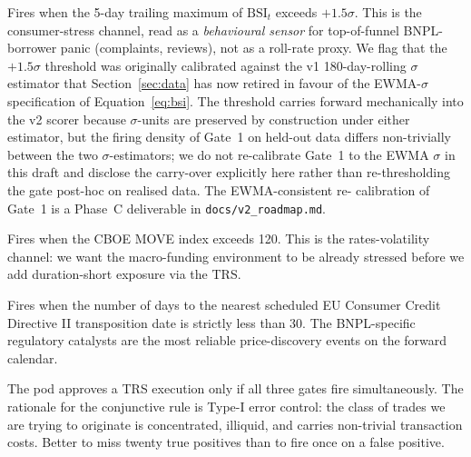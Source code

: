 \documentclass[11pt,letterpaper]{article}
\newcommand{\bsi}{\text{BSI}}
\begin{document}
\begin{description}[leftmargin=2em,style=nextline]
\item[Gate~1 --- BSI momentum.] Fires when the 5-day trailing
maximum of $\bsi_t$ exceeds $+1.5\sigma$. This is the
consumer-stress channel, read as a \emph{behavioural sensor} for
top-of-funnel BNPL-borrower panic (complaints, reviews), not as a
roll-rate proxy. We flag that the $+1.5\sigma$ threshold was
originally calibrated against the v1 180-day-rolling $\sigma$
estimator that Section~\ref{sec:data} has now retired in favour of
the EWMA-$\sigma$ specification of Equation~\eqref{eq:bsi}. The
threshold carries forward mechanically into the v2 scorer because
$\sigma$-units are preserved by construction under either
estimator, but the firing density of Gate~1 on held-out data
differs non-trivially between the two $\sigma$-estimators; we do
not re-calibrate Gate~1 to the EWMA $\sigma$ in this draft and
disclose the carry-over explicitly here rather than re-thresholding
the gate post-hoc on realised data. The EWMA-consistent re-
calibration of Gate~1 is a Phase~C deliverable in
\texttt{docs/v2\_roadmap.md}.
\item[Gate~2 --- MOVE level.] Fires when the CBOE MOVE index exceeds
120. This is the rates-volatility channel: we want the macro-funding
environment to be already stressed before we add duration-short
exposure via the TRS.
\item[Gate~3 --- CCD~II catalyst proximity.] Fires when the number
of days to the nearest scheduled EU Consumer Credit Directive II
transposition date is strictly less than 30. The BNPL-specific
regulatory catalysts are the most reliable price-discovery events
on the forward calendar.
\end{description}

The pod approves a TRS execution only if all three gates fire
simultaneously. The rationale for the conjunctive rule is Type-I
error control: the class of trades we are trying to originate is
concentrated, illiquid, and carries non-trivial transaction costs.
Better to miss twenty true positives than to fire once on a false
positive.
\end{document}
